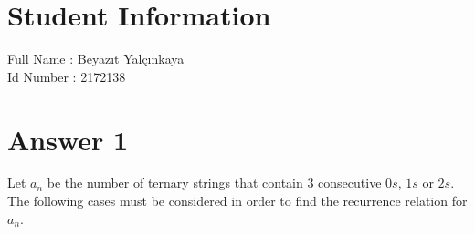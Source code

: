 \documentclass[12pt]{article}
\begin{document}
	
\section*{Student Information } 
Full Name : Beyazıt Yalçınkaya \\
Id Number : 2172138 \\

\section*{Answer 1}

Let $a_n$ be the number of ternary strings that contain $3$ consecutive $0s$, $1s$ or $2s$. The following cases must be considered in order to find the recurrence relation for $a_n$.
\end{document}
